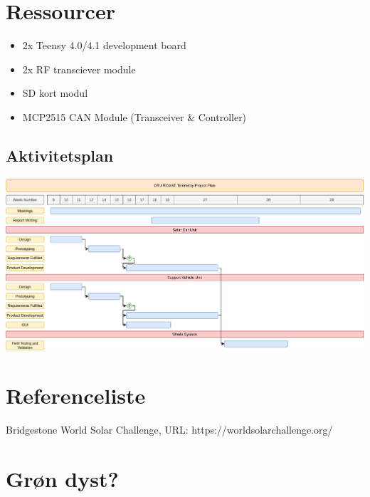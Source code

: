 \documentclass[]{article}
\begin{document}
\section{Ressourcer}
\begin{itemize}
    \item 2x Teensy 4.0/4.1 development board
    \item 2x RF transciever module
    \item SD kort modul
    \item MCP2515 CAN Module (Transceiver & Controller)
\end{itemize}
\begin{landscape}
\section{Aktivitetsplan}
\hspace{1.5cm}\includegraphics[width=1.45\textwidth]{documentation/images/projectPlan.pdf}
\end{landscape}
\section{Referenceliste}
\begin{thebibliography}{9}
Bridgestone World Solar Challenge, 
URL: https://worldsolarchallenge.org/
\end{thebibliography}
\section{Grøn dyst?}
\end{document}
